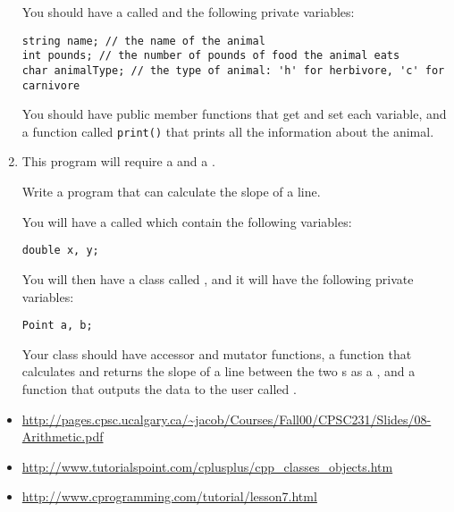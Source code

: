 \begin{enumerate}
You should have a  called  and the following private variables:

\noindent\begin{minipage}{\linewidth}\begin{lstlisting}
string name; // the name of the animal
int pounds; // the number of pounds of food the animal eats
char animalType; // the type of animal: 'h' for herbivore, 'c' for carnivore
\end{lstlisting}\end{minipage}

You should have public member functions that get and set each variable, and a function called \texttt{print()} that prints all the information about the animal.

\item This program will require a  and a .

Write a program that can calculate the slope of a line.

You will have a  called  which contain the following variables:

\noindent\begin{minipage}{\linewidth}\begin{lstlisting}
double x, y;
\end{lstlisting}\end{minipage}

You will then have a class called , and it will have the following private variables:

\noindent\begin{minipage}{\linewidth}\begin{lstlisting}
Point a, b;
\end{lstlisting}\end{minipage}

Your class should have accessor and mutator functions, a function that calculates and returns the slope of a line between the two s as a , and a function that outputs the data to the user called .
\end{enumerate}





\begin{itemize}
\item \url{http://pages.cpsc.ucalgary.ca/~jacob/Courses/Fall00/CPSC231/Slides/08-Arithmetic.pdf}
\item \url{http://www.tutorialspoint.com/cplusplus/cpp_classes_objects.htm}
\item \url{http://www.cprogramming.com/tutorial/lesson7.html}
\end{itemize}	
